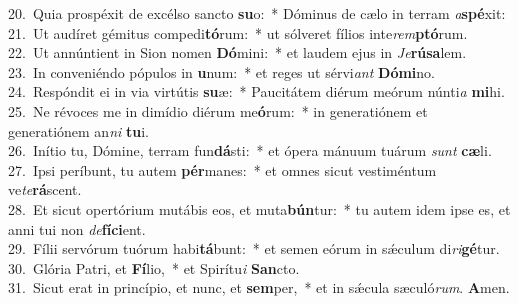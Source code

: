 {20.~}Quia prospéxit de excélso sancto \textbf{su}o:~* Dóminus de cælo in terram \textit{a}\textbf{spé}xit:\\
{21.~}Ut audíret gémitus compedi\textbf{tó}rum:~* ut sólveret fílios inte\textit{rem}\textbf{ptó}rum.\\
{22.~}Ut annúntient in Sion nomen \textbf{Dó}mini:~* et laudem ejus in \textit{Je}\textbf{rú}\textbf{sa}lem.\\
{23.~}In conveniéndo pópulos in \textbf{u}num:~* et reges ut sérvi\textit{ant} \textbf{Dó}\textbf{mi}no.\\
{24.~}Respóndit ei in via virtútis \textbf{su}æ:~* Paucitátem diérum meórum núnti\textit{a} \textbf{mi}hi.\\
{25.~}Ne révoces me in dimídio diérum me\textbf{ó}rum:~* in generatiónem et generatiónem an\textit{ni} \textbf{tu}i.\\
{26.~}Inítio tu, Dómine, terram fun\textbf{dá}sti:~* et ópera mánuum tuárum \textit{sunt} \textbf{cæ}li.\\
{27.~}Ipsi períbunt, tu autem \textbf{pér}manes:~* et omnes sicut vestiméntum ve\textit{te}\textbf{rá}scent.\\
{28.~}Et sicut opertórium mutábis eos, et muta\textbf{bún}tur:~* tu autem idem ipse es, et anni tui non \textit{de}\textbf{fí}\textbf{ci}ent.\\
{29.~}Fílii servórum tuórum habi\textbf{tá}bunt:~* et semen eórum in sǽculum di\textit{ri}\textbf{gé}tur.\\
{30.~}Glória Patri, et \textbf{Fí}lio,~* et Spirítu\textit{i} \textbf{San}cto.\\
{31.~}Sicut erat in princípio, et nunc, et \textbf{sem}per,~* et in sǽcula sæculó\textit{rum}. \textbf{A}men.\\
